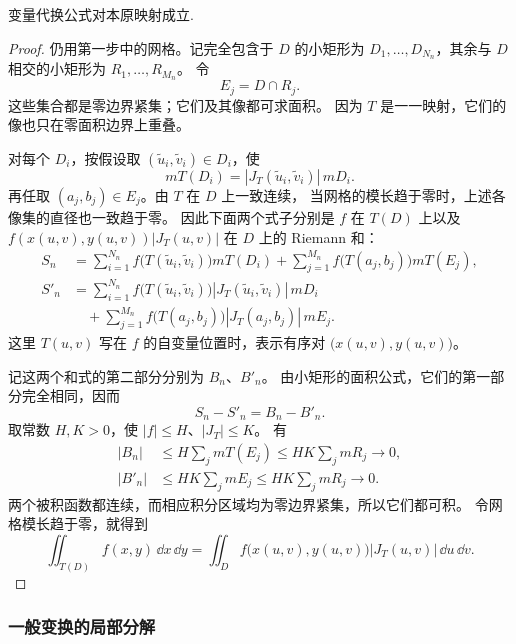 \begin{lemma}
	变量代换公式对本原映射成立.
\end{lemma}
\begin{proof}
	仍用第一步中的网格。记完全包含于 $D$ 的小矩形为
$D_1,\ldots,D_{N_n}$，其余与 $D$ 相交的小矩形为 $R_1,\ldots,R_{M_n}$。
令
\[
E_j=D\cap R_j.
\]
这些集合都是零边界紧集；它们及其像都可求面积。
因为 $T$ 是一一映射，它们的像也只在零面积边界上重叠。

对每个 $D_i$，按假设取 $(\widetilde u_i,\widetilde v_i)\in D_i$，使
\[
mT(D_i)=|J_T(\widetilde u_i,\widetilde v_i)|\,mD_i.
\]
再任取 $(a_j,b_j)\in E_j$。由 $T$ 在 $D$ 上一致连续，
当网格的模长趋于零时，上述各像集的直径也一致趋于零。
因此下面两个式子分别是 $f$ 在 $T(D)$ 上以及
$f(x(u,v),y(u,v))|J_T(u,v)|$ 在 $D$ 上的 Riemann 和：
\begin{align*}
S_n
&=\sum_{i=1}^{N_n}
 f\bigl(T(\widetilde u_i,\widetilde v_i)\bigr)mT(D_i)
 +\sum_{j=1}^{M_n}f\bigl(T(a_j,b_j)\bigr)mT(E_j),\\
S'_n
&=\sum_{i=1}^{N_n}
 f\bigl(T(\widetilde u_i,\widetilde v_i)\bigr)
 |J_T(\widetilde u_i,\widetilde v_i)|\,mD_i\\
&\quad+\sum_{j=1}^{M_n}
 f\bigl(T(a_j,b_j)\bigr)|J_T(a_j,b_j)|\,mE_j.
\end{align*}
这里 $T(u,v)$ 写在 $f$ 的自变量位置时，表示有序对
$\bigl(x(u,v),y(u,v)\bigr)$。

记这两个和式的第二部分分别为 $B_n$、$B'_n$。
由小矩形的面积公式，它们的第一部分完全相同，因而
\[
S_n-S'_n=B_n-B'_n.
\]
取常数 $H,K>0$，使 $|f|\le H$、$|J_T|\le K$。
有
\begin{align*}
|B_n|
&\le H\sum_jmT(E_j)
 \le HK\sum_jmR_j\longrightarrow0,\\
|B'_n|
&\le HK\sum_jmE_j
 \le HK\sum_jmR_j\longrightarrow0.
\end{align*}
两个被积函数都连续，而相应积分区域均为零边界紧集，所以它们都可积。
令网格模长趋于零，就得到
\begin{equation}\label{p2-triangular-substitution}
\iint_{T(D)}f(x,y)\,\dd x\,\dd y
=\iint_D f\bigl(x(u,v),y(u,v)\bigr)|J_T(u,v)|\,\dd u\,\dd v.
\end{equation}
\end{proof}



\subsubsection*{一般变换的局部分解}

